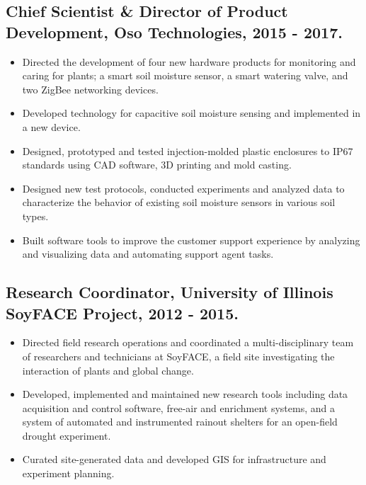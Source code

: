 \documentclass[letterpaper]{article}
\begin{document}
  \subsection*{Chief Scientist \& Director of Product Development, Oso Technologies, 2015 - 2017.}

    \begin{itemize}

      \item Directed the development of four new hardware products for monitoring and caring for plants; a smart soil moisture sensor, a smart watering valve, and two ZigBee networking devices.
      \item Developed technology for capacitive soil moisture sensing and implemented in a new device.
      \item Designed, prototyped and tested injection-molded plastic enclosures to IP67 standards using CAD software, 3D printing and mold casting.
      \item Designed new test protocols, conducted experiments and analyzed data to characterize the behavior of existing soil moisture sensors in various soil types.
      \item Built software tools to improve the customer support experience by analyzing and visualizing data and automating support agent tasks.

    \end{itemize}

  \subsection*{Research Coordinator, University of Illinois SoyFACE Project, 2012 - 2015.}

    \begin{itemize}

      \item Directed field research operations and coordinated a multi-disciplinary team of researchers and technicians at SoyFACE, a field site investigating the interaction of plants and global change.
      \item Developed, implemented and maintained new research tools including data acquisition and control software, free-air  and  enrichment systems, and a system of automated and instrumented rainout shelters for an open-field drought experiment.
      \item Curated site-generated data and developed GIS for infrastructure and experiment planning.

    \end{itemize}
\end{document}
